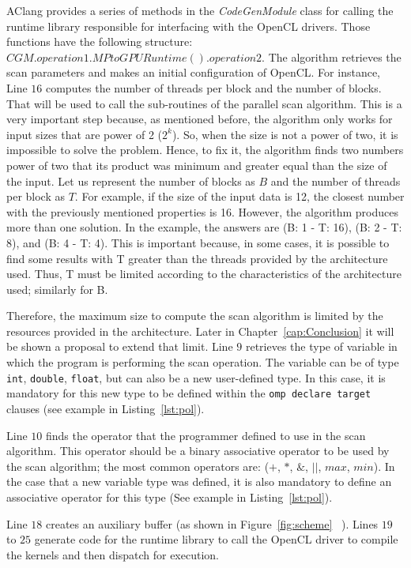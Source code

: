 \documentclass[Ingles]{ic-tese-v1}
\newcommand{\rcap}[1]{Chapter~\ref{cap:#1}}
\newcommand{\rfig}[1]{Figure~\ref{fig:#1}}
\newcommand{\ttt}[1]{{\texttt{#1}}}
\newcommand{\rlst}[1]{Listing~\ref{lst:#1}}
\begin{document}
AClang provides a series of methods in the {\it CodeGenModule} class for
calling the runtime library responsible for interfacing with the OpenCL
drivers. Those functions have the following structure:
$CGM.operation1.MPtoGPURuntime().operation2$. The algorithm retrieves the scan
parameters and makes an initial configuration of OpenCL. For instance, Line $16$ computes
the number of threads per block and the number of blocks. That will be used to
call the sub-routines of the parallel scan algorithm. This is a very important
step because, as mentioned before, the algorithm only works for input sizes that
are power of 2 ($2^{k}$). So, when the size is not a power of two, it is
impossible to solve the problem. Hence, to fix it, the algorithm finds two numbers power of two that its product was minimum and greater equal than the size of the input. Let us represent the
number of blocks as $B$ and the number of threads per block as $T$.
For example, if the size of the input data is 12, the closest number with
the previously mentioned properties is 16. However, the algorithm produces more
than one solution. In the example, the answers are (B: 1 - T: 16), (B: 2 - T:
8), and (B: 4 - T: 4). This is important because, in some cases, it is possible
to find some results with T greater than the threads provided by the
architecture used. Thus, T must be limited according to the characteristics of
the architecture used; similarly for B.

Therefore, the maximum size to compute the scan algorithm is limited by the
resources provided in the architecture. Later in \rcap{Conclusion} it will be shown
a proposal to extend that limit.  Line $9$ retrieves the type of variable in
which the program is performing the scan operation. The variable can be of
type  \ttt{int},  \ttt{double},  \ttt{float}, but can also be a new user-defined type. In this case,
it is mandatory for this new type to be defined within the \ttt{omp declare target}
clauses (see example in \rlst{pol}).

Line $10$ finds the operator that the programmer defined to use in the scan
algorithm. This operator should be a binary associative operator to be used
by the scan algorithm; the most common operators are: ($+$, $*$, $\&$, $||$,
$max$, $min$). In the case that a new variable type was defined, it is also mandatory
to define an associative operator for this type (See example in \rlst{pol}).

Line $18$ creates an auxiliary buffer (as shown in \rfig{scheme} ~).  Lines $19$ to $25$
generate code for the runtime library to call the OpenCL driver to compile the
kernels and then dispatch  for execution.
\end{document}
